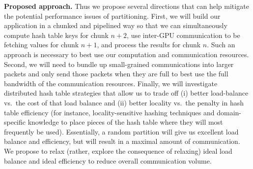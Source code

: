 \noindent
{\bf Proposed approach.}
Thus we propose several directions that can help mitigate the potential performance issues of partitioning. First, we will build our application in a chunked and pipelined way so that we can simultaneously compute hash table keys for chunk $n+2$, use inter-GPU communication to be fetching values for chunk $n+1$, and process the results for chunk $n$. Such an approach is necessary to best use our computation and communication resources. Second, we will need to bundle up small-grained communications into larger packets and only send those packets when they are full to best use the full bandwidth of the communication resources. Finally, we will investigate distributed hash table strategies that allow us to trade off (i) better load-balance vs.\ the cost of that load balance and (ii) better locality vs.\ the penalty in hash table efficiency (for instance, locality-sensitive hashing techniques and domain-specific knowledge to place pieces of the hash table where they will most frequently be used).    Essentially, a random partition will give us excellent load balance and efficiency, but will result in a maximal amount of communication. We propose to relax (rather, explore the consequence of relaxing) ideal load balance and ideal efficiency to reduce overall communication volume.







